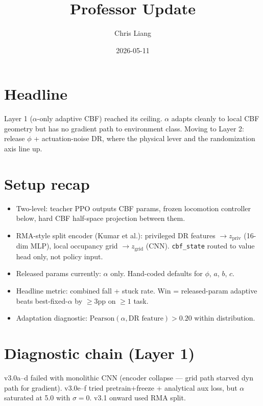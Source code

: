 \documentclass[11pt]{article}
\title{Professor Update}
\author{Chris Liang}
\date{2026-05-11}
\begin{document}
\maketitle

\section*{Headline}

Layer 1 ($\alpha$-only adaptive CBF) reached its ceiling. $\alpha$ adapts cleanly to local CBF geometry but has no gradient path to environment class. Moving to Layer 2: release $\phi$ + actuation-noise DR, where the physical lever and the randomization axis line up.

\section*{Setup recap}

\begin{itemize}
\item Two-level: teacher PPO outputs CBF params, frozen locomotion controller below, hard CBF half-space projection between them.
\item RMA-style split encoder (Kumar et al.): privileged DR features $\to z_{\text{priv}}$ (16-dim MLP), local occupancy grid $\to z_{\text{grid}}$ (CNN). \texttt{cbf\_state} routed to value head only, not policy input.
\item Released params currently: $\alpha$ only. Hand-coded defaults for $\phi$, $a$, $b$, $c$.
\item Headline metric: combined fall + stuck rate. Win = released-param adaptive beats best-fixed-$\alpha$ by $\geq 3$pp on $\geq 1$ task.
\item Adaptation diagnostic: $\text{Pearson}(\alpha, \text{DR feature}) > 0.20$ within distribution.
\end{itemize}

\section*{Diagnostic chain (Layer 1)}

v3.0a--d failed with monolithic CNN (encoder collapse --- grid path starved dyn path for gradient). v3.0e--f tried pretrain+freeze + analytical aux loss, but $\alpha$ saturated at 5.0 with $\sigma=0$. v3.1 onward used RMA split.
\end{document}
